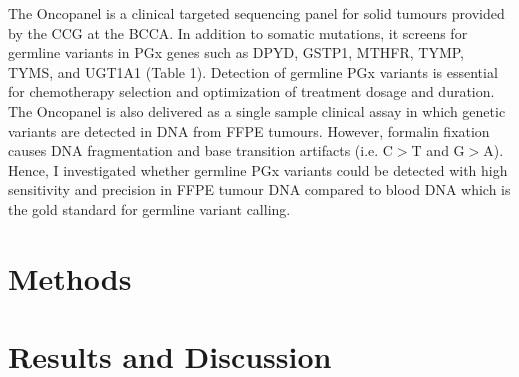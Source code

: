 The Oncopanel is a clinical targeted sequencing panel for solid tumours provided by the CCG at the BCCA. In addition to somatic mutations, it screens for germline variants in PGx genes such as DPYD, GSTP1, MTHFR, TYMP, TYMS, and UGT1A1 (Table 1). Detection of germline PGx variants is essential for chemotherapy selection and optimization of treatment dosage and duration. The Oncopanel is also delivered as a single sample clinical assay in which genetic variants are detected in DNA from FFPE tumours. However, formalin fixation causes DNA fragmentation and base transition artifacts (i.e. C$>$T and G$>$A). Hence, I investigated whether germline PGx variants could be detected with high sensitivity and precision in FFPE tumour DNA compared to blood DNA which is the gold standard for germline variant calling.

\section{Methods}
\label{sec:Methods}

\section{Results and Discussion}
\label{sec:Results and Discussion}
